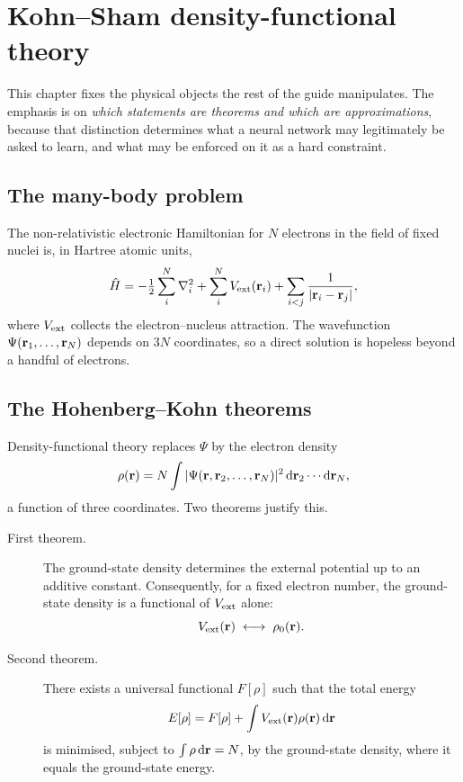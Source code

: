 \chapter{Kohn--Sham density-functional theory}
\label{ch:ksdft}

This chapter fixes the physical objects the rest of the guide manipulates. The
emphasis is on \emph{which statements are theorems and which are
approximations}, because that distinction determines what a neural network may
legitimately be asked to learn, and what may be enforced on it as a hard
constraint.

\section{The many-body problem}

The non-relativistic electronic Hamiltonian for $N$ electrons in the field of
fixed nuclei is, in Hartree atomic units,
\begin{equation}
  \hat{H}
  = -\tfrac{1}{2}\sum_{i}^{N}\nabla_i^2
    + \sum_{i}^{N}V_{\mathrm{ext}}(\mathbf{r}_i)
    + \sum_{i<j}\frac{1}{|\mathbf{r}_i-\mathbf{r}_j|} ,
  \label{eq:hamiltonian}
\end{equation}
where $V_{\mathrm{ext}}$ collects the electron--nucleus attraction. The wavefunction
$\Psi(\mathbf{r}_1,\dots,\mathbf{r}_N)$ depends on $3N$ coordinates, so a direct solution is
hopeless beyond a handful of electrons.

\section{The Hohenberg--Kohn theorems}
\label{sec:hk}

Density-functional theory replaces $\Psi$ by the electron density
\begin{equation}
  \rho(\mathbf{r}) = N\int |\Psi(\mathbf{r},\mathbf{r}_2,\dots,\mathbf{r}_N)|^2\,
              \mathrm{d}\mathbf{r}_2\cdots\mathrm{d}\mathbf{r}_N ,
\end{equation}
a function of three coordinates. Two theorems justify this.

\begin{description}
  \item[First theorem.] The ground-state density determines the external
    potential up to an additive constant. Consequently, for a fixed electron
    number, the ground-state density is a functional of $V_{\mathrm{ext}}$ alone:
    \begin{equation}
      V_{\mathrm{ext}}(\mathbf{r}) \;\longleftrightarrow\; \rho_0(\mathbf{r}).
      \label{eq:hkmap}
    \end{equation}
  \item[Second theorem.] There exists a universal functional $F[\rho]$ such that
    the total energy
    \begin{equation}
      E[\rho] = F[\rho] + \int V_{\mathrm{ext}}(\mathbf{r})\rho(\mathbf{r})\,\mathrm{d}\mathbf{r}
      \label{eq:energyfunctional}
    \end{equation}
    is minimised, subject to $\int\rho\,\mathrm{d}\mathbf{r} = N$, by the ground-state
    density, where it equals the ground-state energy.
\end{description}

